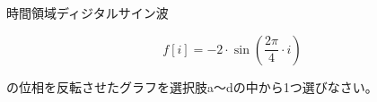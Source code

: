時間領域ディジタルサイン波 

\[
f[i] = -2 \cdot \sin \left ( \frac{2 \pi}{4}  \cdot i \right )
\]

\noindent の位相を反転させたグラフを選択肢a〜dの中から1つ選びなさい。
